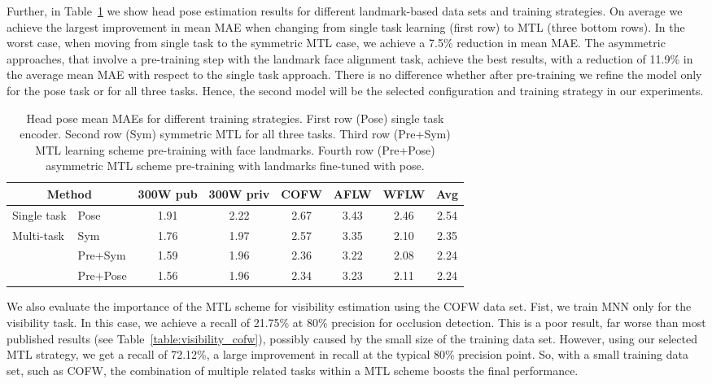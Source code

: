 \documentclass[9pt,technote,compsoc]{IEEEtran}
\begin{document}
Further, in Table~\ref{table:multitask_improvement} we show head pose estimation results for different landmark-based data sets and training strategies. On average we achieve the largest improvement in mean \textrm{MAE} when changing from single task learning (first row) to MTL (three bottom rows). In the worst case, when moving from single task to the symmetric MTL case, we achieve a 7.5\% reduction in mean \textrm{MAE}. 
The asymmetric approaches, that involve a pre-training step with the landmark face alignment task, achieve the best results, with a reduction of 11.9\% in the average mean \textrm{MAE} with respect to the single task approach. 
There is no difference whether after pre-training we refine the model only for the pose task or for all three tasks.
Hence, the second model will be the selected configuration and training strategy in our experiments.




\begin{table}[htbp!]
\begin{center}
\setlength\tabcolsep{1.7pt}
\begin{tabular}{l|l|c|c|c|c|c||c}
\hline
\multicolumn{2}{c|}{Method} & 300W pub & 300W priv & COFW & AFLW & WFLW & Avg\\
\hline
Single task & Pose & 1.91 & 2.22 & 2.67 & 3.43 & 2.46 & 2.54\\ 
\hline
\multirow{3}{*}{Multi-task} & Sym & 1.76 & 1.97 & 2.57 & 3.35 & 2.10 & 2.35\\
& Pre+Sym & 1.59 & 1.96 & 2.36 & 3.22 & 2.08 & 2.24\\
& Pre+Pose & 1.56 & 1.96 & 2.34 & 3.23 & 2.11 & 2.24\\
\hline
\end{tabular}
\end{center}
\caption{Head pose mean MAEs for different training strategies. First row (Pose) single task encoder. Second row (Sym) symmetric MTL for all three tasks. Third row (Pre+Sym) MTL learning scheme pre-training with face landmarks. Fourth row (Pre+Pose) asymmetric MTL scheme pre-training with landmarks fine-tuned with pose.}
\label{table:multitask_improvement}
\end{table}







We also evaluate the importance of the MTL scheme for visibility estimation using the COFW data set. Fist, we train MNN only for the visibility task. In this case, we achieve a recall of 21.75\% at 80\% precision for occlusion detection. This is a poor result, far worse than most published results (see Table~\ref{table:visibility_cofw}),  possibly caused by the small size of the training data set. However, using our selected MTL strategy, we get a recall of 72.12\%, a large improvement in recall at the typical 80\% precision point. So, with a small training data set, such as COFW, the combination of multiple related tasks within a MTL scheme boosts the final performance. 
\end{document}
